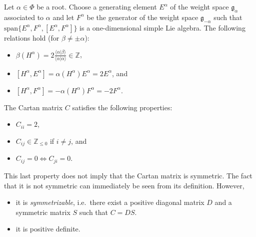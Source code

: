     \begin{property}
        Let $\alpha\in\Phi$ be a root. Choose a generating element $E^\alpha$ of the weight space $\mathfrak{g}_\alpha$ associated to $\alpha$ and let $F^\alpha$ be the generator of the weight space $\mathfrak{g}_{-\alpha}$ such that $\mathrm{span}\{E^\alpha,F^\alpha,[E^\alpha,F^\alpha]\}$ is a one-dimensional simple Lie algebra. The following relations hold (for $\beta\neq\pm\alpha$):
        \begin{itemize}
            \item $\beta(H^\alpha) = 2\frac{\langle\alpha|\beta\rangle}{\langle\alpha|\alpha\rangle}\in\mathbb{Z}$,
            \item $[H^\alpha,E^\alpha] = \alpha(H^\alpha)E^\alpha = 2E^\alpha$, and
            \item $[H^\alpha,F^\alpha] = -\alpha(H^\alpha)F^\alpha = -2F^\alpha$.
        \end{itemize}
    \end{property}

    \begin{property}\label{lie:cartan_prop}
        The Cartan matrix $C$ satisfies the following properties:
        \begin{itemize}
            \item $C_{ii}=2$,
            \item $C_{ij}\in\mathbb{Z}_{\leq0}$ if $i\neq j$, and
            \item $C_{ij}=0\iff C_{ji}=0$.
        \end{itemize}
        This last property does not imply that the Cartan matrix is symmetric. The fact that it is not symmetric can immediately be seen from its definition. However,
        \begin{itemize}
            \item it is \textit{symmetrizable}, i.e.~there exist a positive diagonal matrix $D$ and a symmetric matrix $S$ such that $C=DS$.
            \item it is positive definite.
        \end{itemize}
    \end{property}

